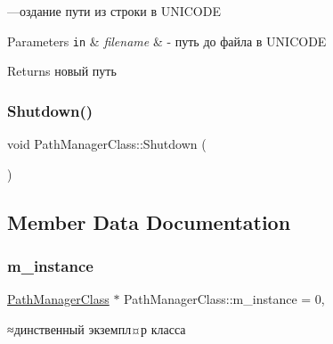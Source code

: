 —оздание пути из строки в U\+N\+I\+C\+O\+DE 


\begin{DoxyParams}[1]{Parameters}
\mbox{\tt in}  & {\em filename} & -\/ путь до файла в U\+N\+I\+C\+O\+DE \\
\hline
\end{DoxyParams}
\begin{DoxyReturn}{Returns}
новый путь 
\end{DoxyReturn}
\mbox{\label{class_path_manager_class_ab8f5564be2ffb04e48847840bfe0ff9f}} 
\subsubsection{\texorpdfstring{Shutdown()}{Shutdown()}}
{\footnotesize\ttfamily void Path\+Manager\+Class\+::\+Shutdown (\begin{DoxyParamCaption}{ }\end{DoxyParamCaption})}



\subsection{Member Data Documentation}
\mbox{\label{class_path_manager_class_a7712e855307df9fee875a5ed8eac9bd6}} 
\subsubsection{\texorpdfstring{m\+\_\+instance}{m\_instance}}
{\footnotesize\ttfamily \hyperlink{class_path_manager_class}{Path\+Manager\+Class} $\ast$ Path\+Manager\+Class\+::m\+\_\+instance = 0\hspace{0.3cm}{\ttfamily [static]}, {\ttfamily [private]}}



≈динственный экземпл¤р класса 

\mbox{\label{class_path_manager_class_a1648b63352c73698ed7435aa663ac071}} 
